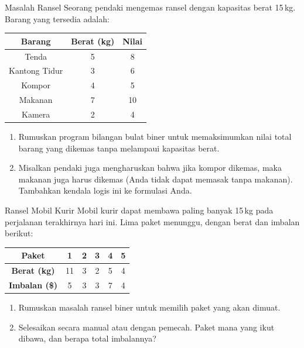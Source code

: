 \begin{ex}{Masalah Ransel}{}
\label{ex:knapsack-hiker}
 Seorang pendaki mengemas ransel dengan kapasitas berat 15\,kg. Barang yang tersedia adalah:

\begin{center}
\begin{tabular}{c|c|c}
\textbf{Barang} & \textbf{Berat (kg)} & \textbf{Nilai} \\
\hline
Tenda & 5 & 8 \\
Kantong Tidur & 3 & 6 \\
Kompor & 4 & 5 \\
Makanan & 7 & 10 \\
Kamera & 2 & 4 \\
\end{tabular}
\par{}\label{tab:integerProgrammingFormulations-book1-tab02}%

\end{center}

\begin{enumerate}
\item Rumuskan program bilangan bulat biner untuk memaksimumkan nilai total barang yang dikemas tanpa melampaui kapasitas berat.
\item Misalkan pendaki juga mengharuskan bahwa jika kompor dikemas, maka makanan juga harus dikemas (Anda tidak dapat memasak tanpa makanan). Tambahkan kendala logis ini ke formulasi Anda.
\end{enumerate}
\end{ex}

\begin{ex}{Ransel Mobil Kurir}{}
\label{ex:knapsack-warmup}
 Mobil kurir dapat membawa paling banyak 15\,kg pada perjalanan terakhirnya hari ini. Lima paket menunggu, dengan berat dan imbalan berikut:

\begin{center}
\begin{tabular}{c|c|c|c|c|c}
\textbf{Paket} & 1 & 2 & 3 & 4 & 5 \\
\hline
\textbf{Berat (kg)} & 11 & 3 & 2 & 5 & 4 \\
\textbf{Imbalan (\$)} & 5 & 3 & 3 & 7 & 4 \\
\end{tabular}
\par{}\label{tab:integerProgrammingFormulations-book1-tab03}%

\end{center}

\begin{enumerate}
\item Rumuskan masalah ransel biner untuk memilih paket yang akan dimuat.
\item Selesaikan secara manual atau dengan pemecah. Paket mana yang ikut dibawa, dan berapa total imbalannya?
\end{enumerate}
\end{ex}

